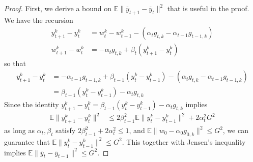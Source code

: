 \begin{proof}
	First, we derive a bound on $\mathbb{E}\|\overline{y}_{t+1}-\overline{y}_{t}\|^{2}$
	that is useful in the proof. We have the recursion 
	\begin{align*}
	y_{t+1}^{k}-y_{t}^{k} & =w_{t}^{k}-w_{t-1}^{k}-(\alpha_{t}g_{t,k}-\alpha_{t-1}g_{t-1,k})\\
	w_{t+1}^{k}-w_{t}^{k} & =-\alpha_{t}g_{t,k}+\beta_{t}(y_{t+1}^{k}-y_{t}^{k})
	\end{align*}
	so that 
	\begin{align*}
	y_{t+1}^{k}-y_{t}^{k} & =-\alpha_{t-1}g_{t-1,k}+\beta_{t-1}(y_{t}^{k}-y_{t-1}^{k})-(\alpha_{t}g_{t,k}-\alpha_{t-1}g_{t-1,k})\\
	& =\beta_{t-1}(y_{t}^{k}-y_{t-1}^{k})-\alpha_{t}g_{t,k}
	\end{align*}
	Since the identity $y_{t+1}^{k}-y_{t}^{k}=\beta_{t-1}(y_{t}^{k}-y_{t-1}^{k})-\alpha_{t}g_{t,k}$
	implies 
	\begin{align*}
	\mathbb{E}\|y_{t+1}^{k}-y_{t}^{k}\|^{2} & \leq2\beta_{t-1}^{2}\mathbb{E}\|y_{t}^{k}-y_{t-1}^{k}\|^{2}+2\alpha_{t}^{2}G^{2}
	\end{align*}
	as long as $\alpha_{t},\beta_{t}$ satisfy $2\beta_{t-1}^{2}+2\alpha_{t}^{2}\leq1$,
	and\textbf{ $\mathbb{E}\|w_{0}-\alpha_{0}g_{0,k}\|^{2}\leq G^{2}$},
	we can guarantee that $\mathbb{E}\|y_{t}^{k}-y_{t-1}^{k}\|^{2}\leq G^{2}$.
	This together with Jensen's inequality implies $\mathbb{E}\|\overline{y}_{t}-\overline{y}_{t-1}\|^{2}\leq G^{2}$. 
	

\end{proof}
